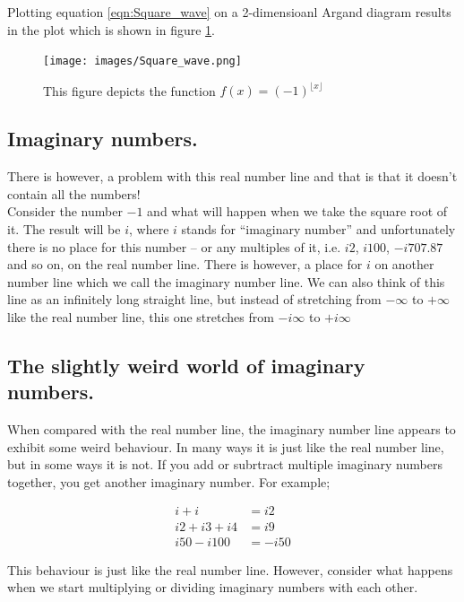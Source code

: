 \documentclass{article}
\begin{document}
Plotting equation \ref{eqn:Square_wave} on a 2-dimensioanl Argand diagram results in the plot which is shown
in figure \ref{fig:Square_wave}.

\begin{figure}[h!]
  \texttt{[image: images/Square\_wave.png]}
  \caption{This figure depicts the function $f(x) = (-1)^{\lfloor x\rfloor}$}
  \label{fig:Square_wave}
\end{figure}


\subsection{Imaginary numbers.}

There is however, a problem with this real number line and that is that it doesn't contain all the numbers!\\ 

Consider the number $-1$ and what will happen when we take the square root of it. The result will be $i$, where 
$i$ stands for ``imaginary number'' and unfortunately there is no place for this number -- or any multiples of it,
i.e. $i2$, $i100$, $-i707.87$ and so on, on the real number line. There is however, a place for $i$ on another
number line which we call the imaginary number line. We can also think
of this line as an infinitely long straight line, but instead of stretching from $-\infty$ to $+\infty$ like the real
number line, this one stretches from $-i\infty$ to $+i\infty$


\subsection{The slightly weird world of imaginary numbers.}

When compared with the real number line, the imaginary number line appears to exhibit some weird behaviour. 
In many ways it is just like the real number line, but in some ways it is not. If you add or subrtract multiple imaginary numbers together, you get another imaginary number. For example;

\begin{align*}
i + i &= i2 \\
i2 + i3 + i4 &= i9 \\
i50 - i100 &= -i50 
\end{align*}

This behaviour is just like the real number line. However, consider what happens when we start multiplying or dividing
imaginary numbers with each other.
\end{document}
